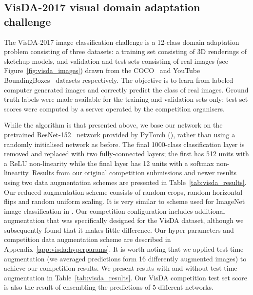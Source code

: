 \documentclass{article}
\begin{document}
\subsection{VisDA-2017 visual domain adaptation challenge}
\label{exp:visda}


The VisDA-2017 image classification challenge is a 12-class domain adaptation problem consisting of three datasets: a training set consisting of 3D renderings of sketchup models, and validation and test sets consisting of real images (see Figure~\ref{fig:visda_images}) drawn from the COCO~\cite{Lin:CoCo} and YouTube BoundingBoxes~\cite{Real:YoutubeBB} datasets respectively. The objective is to learn from labeled computer generated images and correctly predict the class of real images. Ground truth labels were made available for the training and validation sets only; test set scores were computed by a server operated by the competition organisers. 

While the algorithm is that presented above, we base our network on the pretrained ResNet-152~\cite{He:ResNet} network provided by PyTorch (\cite{PyTorch}), rather than using a randomly initialised network as before. The final 1000-class classification layer is removed and replaced with two fully-connected layers; the first has 512 units with a ReLU non-linearity while the final layer has 12 units with a softmax non-linearity. Results from our original competition submissions and newer results using two data augmentation schemes are presented in Table~\ref{tab:visda_results}. Our reduced augmentation scheme consists of random crops, random horizontal flips and random uniform scaling. It is very similar to scheme used for ImageNet image classification in \cite{He:ResNet}. Our competition configuration includes additional augmentation that was specifically designed for the VisDA dataset, although we subsequently found that it makes little difference. Our hyper-parameters and competition data augmentation scheme are described in Appendix~\ref{app:visda:hyperparams}. It is worth noting that we applied test time augmentation (we averaged predictions form 16 differently augmented images) to achieve our competition results. We present resuts with and without test time augmentation in Table~\ref{tab:visda_results}. Our VisDA competition test set score is also the result of ensembling the predictions of 5 different networks.
\end{document}
